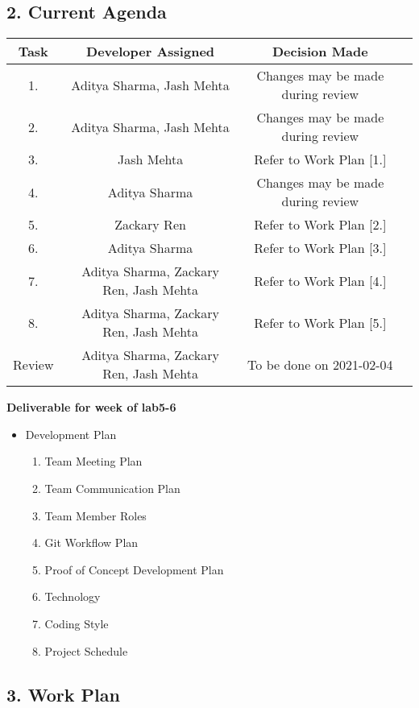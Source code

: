 \documentclass[11pt, oneside]{article}   	%
\begin{document}
\setlength{\headsep}{25pt}
\subsection*{2. Current Agenda}

\begin{center}
\begin{tabular}{ | c | c | c | c | }
\hline
Task & Developer Assigned & Decision Made\\
\hline
1. & Aditya Sharma, Jash Mehta & Changes may be made during review \\
\hline
2. & Aditya Sharma, Jash Mehta & Changes may be made during review \\
\hline
3. & Jash Mehta & Refer to Work Plan [1.]\\
\hline
4. & Aditya Sharma & Changes may be made during review\\
\hline
5. & Zackary Ren & Refer to Work Plan [2.]\\
\hline
6. & Aditya Sharma & Refer to Work Plan [3.]\\
\hline
7. & Aditya Sharma, Zackary Ren, Jash Mehta & Refer to Work Plan [4.]\\
\hline
8. & Aditya Sharma, Zackary Ren, Jash Mehta & Refer to Work Plan [5.]\\
\hline
Review & Aditya Sharma, Zackary Ren, Jash Mehta & To be done on 2021-02-04 \\
\hline
\end{tabular}
\end{center}

\textbf{Deliverable for week of lab5-6}
\begin{itemize}
\item Development Plan
\begin{enumerate}
\item Team Meeting Plan
\item Team Communication Plan
\item Team Member Roles
\item Git Workflow Plan
\item Proof of Concept Development Plan
\item Technology
\item Coding Style
\item Project Schedule
\end{enumerate}
\end{itemize}
\newpage{}

\setlength{\headsep}{25pt}
\subsection*{3. Work Plan}
\end{document}
